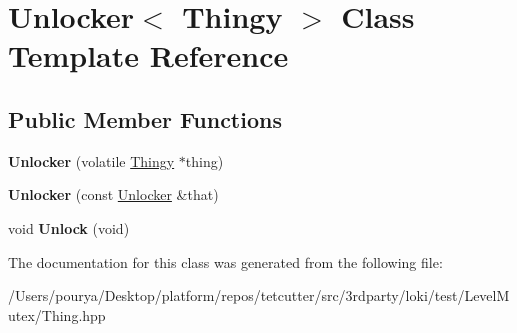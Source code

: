 \hypertarget{classUnlocker}{}\section{Unlocker$<$ Thingy $>$ Class Template Reference}
\label{classUnlocker}
\subsection*{Public Member Functions}
\begin{DoxyCompactItemize}
\item 
\hypertarget{classUnlocker_a512b0d58f01cb75c3d4df5d6794d0fa6}{}{\bfseries Unlocker} (volatile \hyperlink{classThingy}{Thingy} $\ast$thing)\label{classUnlocker_a512b0d58f01cb75c3d4df5d6794d0fa6}

\item 
\hypertarget{classUnlocker_adb19d9a390f06382149124884fcee983}{}{\bfseries Unlocker} (const \hyperlink{classUnlocker}{Unlocker} \&that)\label{classUnlocker_adb19d9a390f06382149124884fcee983}

\item 
\hypertarget{classUnlocker_a8b5058be8a0c186b7077a8bc5a821285}{}void {\bfseries Unlock} (void)\label{classUnlocker_a8b5058be8a0c186b7077a8bc5a821285}

\end{DoxyCompactItemize}


The documentation for this class was generated from the following file\+:\begin{DoxyCompactItemize}
\item 
/\+Users/pourya/\+Desktop/platform/repos/tetcutter/src/3rdparty/loki/test/\+Level\+Mutex/Thing.\+hpp\end{DoxyCompactItemize}

